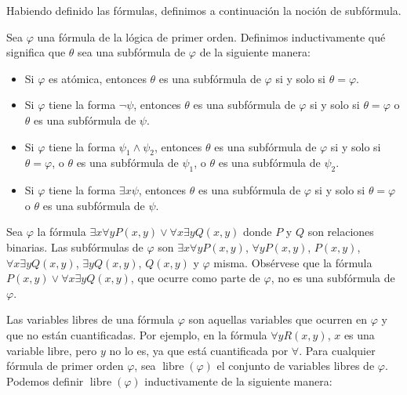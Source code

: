 \documentclass[12pt,a4paper]{book}
\DeclareMathOperator{\libre}{libre}
\begin{document}
    Habiendo definido las fórmulas, definimos a continuación la noción de subfórmula.

    \begin{definicion}\label{def:subformula-fol}
        Sea $\varphi$ una fórmula de la lógica de primer orden. Definimos inductivamente qué significa que $\theta$ sea una
        subfórmula de $\varphi$ de la siguiente manera:
        \begin{itemize}
            \item[$\bullet$] Si $\varphi$ es atómica, entonces $\theta$ es una subfórmula de $\varphi$ si y solo si $\theta=\varphi$.
            \item[$\bullet$] Si $\varphi$ tiene la forma $\neg\psi$, entonces $\theta$ es una subfórmula de $\varphi$ si y solo si
            $\theta=\varphi$ o $\theta$ es una subfórmula de $\psi$.
            \item[$\bullet$] Si $\varphi$ tiene la forma $\psi_{1}\wedge\psi_{2}$, entonces $\theta$ es una subfórmula de $\varphi$
            si y solo si $\theta=\varphi$, o $\theta$ es una subfórmula de $\psi_{1}$, o $\theta$ es una subfórmula de $\psi_{2}$.
            \item[$\bullet$] Si $\varphi$ tiene la forma $\exists x\psi$, entonces $\theta$ es una subfórmula de $\varphi$ si y
            solo si $\theta=\varphi$ o $\theta$ es una subfórmula de $\psi$.
        \end{itemize}
    \end{definicion}

    \begin{ejemplo}\label{ej:subformulas-fol}
        Sea $\varphi$ la fórmula $\exists x\forall yP(x,y)\vee\forall x\exists yQ(x,y)$ donde $P$ y $Q$ son relaciones
        binarias. Las subfórmulas de $\varphi$ son $\exists x\forall yP(x,y)$, $\forall yP(x,y)$, $P(x,y)$,
        $\forall x\exists yQ(x,y)$, $\exists yQ(x,y)$, $Q(x,y)$ y $\varphi$ misma. Obsérvese que la fórmula
        $P(x,y)\vee\forall x\exists yQ(x,y)$, que ocurre como parte de $\varphi$, no es una subfórmula de $\varphi$.
    \end{ejemplo}

    Las variables libres de una fórmula $\varphi$ son aquellas variables que ocurren en $\varphi$ y que no están
    cuantificadas. Por ejemplo, en la fórmula $\forall yR(x,y)$, $x$ es una variable libre, pero $y$ no lo es, ya que está
    cuantificada por $\forall$. Para cualquier fórmula de primer orden $\varphi$, sea $\libre(\varphi)$ el conjunto de
    variables libres de $\varphi$. Podemos definir $\libre(\varphi)$ inductivamente de la siguiente manera:
\end{document}

